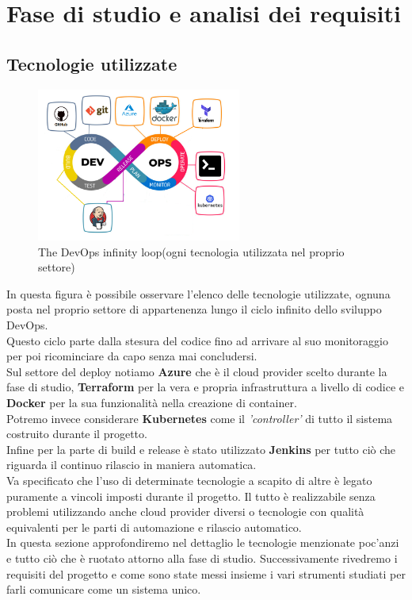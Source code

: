 \documentclass[a4paper,12pt]{report}
\begin{document}
\chapter{Fase di studio e analisi dei requisiti}
\section{Tecnologie utilizzate}
\begin{figure}[h]
	\centering
	\includegraphics[width=0.6\textwidth]{tech_used}
    \caption{The DevOps infinity loop(ogni tecnologia utilizzata nel proprio settore) \cite{devopsloopimg}}
    \label{fig:tech_used}
\end{figure}
In questa figura è possibile osservare l'elenco delle tecnologie utilizzate, ognuna posta nel proprio settore di appartenenza lungo il ciclo infinito dello sviluppo DevOps.\cite{devopsloop}\\
Questo ciclo parte dalla stesura del codice fino ad arrivare al suo monitoraggio per poi ricominciare da capo senza mai concludersi.\\
Sul settore del deploy notiamo \textbf{Azure} che è il cloud provider scelto durante la fase di studio, \textbf{Terraform} per la vera e propria infrastruttura a livello di codice e \textbf{Docker} per la sua funzionalità nella creazione di container.\\
Potremo invece considerare \textbf{Kubernetes}  come il \textit{'controller'} di tutto il sistema costruito durante il progetto.\\
Infine per la parte di build e release è stato utilizzato \textbf{Jenkins} per tutto ciò che riguarda il continuo rilascio in maniera automatica.\\
Va specificato che l'uso di determinate tecnologie a scapito di altre è legato puramente a vincoli imposti durante il progetto. Il tutto è realizzabile senza problemi utilizzando anche cloud provider diversi o tecnologie con qualità equivalenti per le parti di automazione e rilascio automatico.\\
In questa sezione approfondiremo nel dettaglio le tecnologie menzionate poc'anzi e tutto ciò che è ruotato attorno alla fase di studio. Successivamente rivedremo i requisiti del progetto e come sono state messi insieme i vari strumenti studiati per farli comunicare come un sistema unico.
\end{document}
